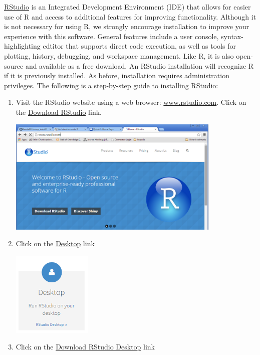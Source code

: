 \documentclass[letterpaper,12pt]{article}\usepackage[]{graphicx}\usepackage[]{color}
\begin{document}
\href{http://www.rstudio.com/}{RStudio} is an Integrated Development Environment (IDE) that allows for easier use of R and access to additional features for improving functionality. Although it is not necessary for using R, we strongly encourage installation to improve your experience with this software.  General features include a user console, syntax-highlighting edtitor that supports direct code execution, as well as tools for plotting, history, debugging, and workspace management.  Like R, it is also open-source and available as a free download.  An RStudio installation will recognize R if it is previously installed.  As before, installation requires administration privileges. The following is a step-by-step guide to installing RStudio:

\begin{enumerate}

\item{Visit the RStudio website using a web browser: \href{http://www.rstudio.com}{www.rstudio.com}.  Click on the \href{http://www.rstudio.com/products/RStudio/}{Download RStudio} link.}

\includegraphics[width=0.8\textwidth]{figs/rstudio.png}

\item{Click on the \href{http://www.rstudio.com/products/RStudio/#Desk}{Desktop} link}

\includegraphics[width=0.3\textwidth]{figs/desktop.png}

\item{Click on the \href{http://www.rstudio.com/products/rstudio/download/}{Download RStudio Desktop} link}


\end{enumerate}
\end{document}
